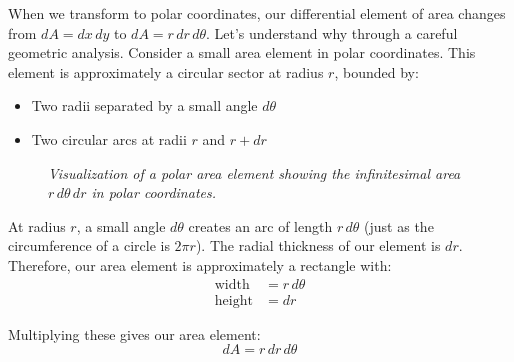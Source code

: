 \noindent When we transform to polar coordinates, our differential element of area changes from $dA = dx\,dy$ to $dA = r\,dr\,d\theta$. Let's understand why through a careful geometric analysis. Consider a small area element in polar coordinates. This element is approximately a circular sector at radius $r$, bounded by:
\begin{itemize}
    \item Two radii separated by a small angle $d\theta$
    \item Two circular arcs at radii $r$ and $r + dr$
\end{itemize}

\begin{figure}[H]
\centering
{}
\caption{\textit{Visualization of a polar area element showing the infinitesimal area $r\,d\theta\,dr$ in polar coordinates.}}
\label{fig:polar_element}
\end{figure}

\noindent At radius $r$, a small angle $d\theta$ creates an arc of length $r\,d\theta$ (just as the circumference of a circle is $2\pi r$). The radial thickness of our element is $dr$. Therefore, our area element is approximately a rectangle with:
\begin{align*}
\text{width} &= r\,d\theta \\
\text{height} &= dr
\end{align*}

\noindent Multiplying these gives our area element:
\[
dA = r\,dr\,d\theta
\]

